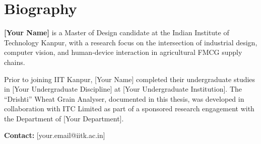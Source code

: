 \chapter*{Biography}
\thispagestyle{plain}

\noindent \textbf{[Your Name]} is a Master of Design candidate at the Indian Institute of Technology Kanpur, with a research focus on the intersection of industrial design, computer vision, and human-device interaction in agricultural FMCG supply chains.

\vspace{1em}

\noindent Prior to joining IIT Kanpur, [Your Name] completed their undergraduate studies in [Your Undergraduate Discipline] at [Your Undergraduate Institution]. The ``Drishti'' Wheat Grain Analyser, documented in this thesis, was developed in collaboration with ITC Limited as part of a sponsored research engagement with the Department of [Your Department].

\vspace{1em}

\noindent \textbf{Contact:} [your.email@iitk.ac.in]
